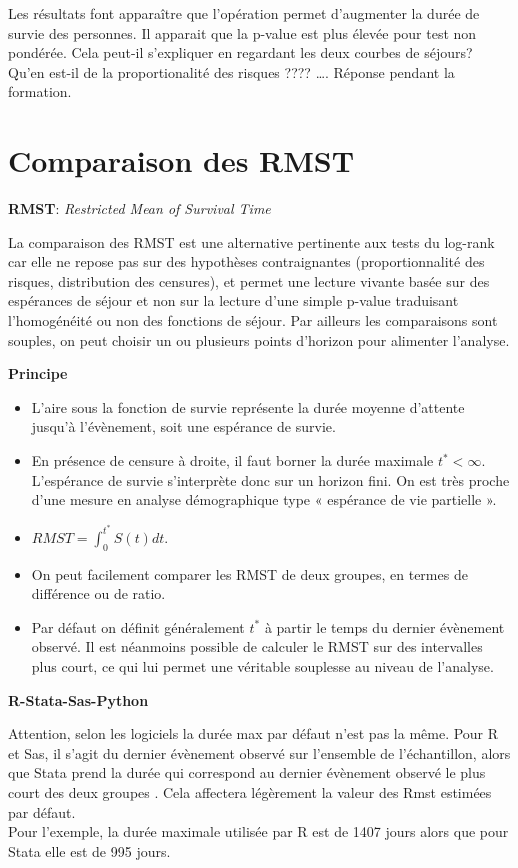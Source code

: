 \documentclass[
  12pt,
  letterpaper,
  DIV=11,
  numbers=noendperiod,
  onepage,
  openany]{scrreprt}
\providecommand{\tightlist}{%
  \setlength{\itemsep}{0pt}\setlength{\parskip}{0pt}}\usepackage{longtable,booktabs,array}
\begin{document}
Les résultats font apparaître que l'opération permet d'augmenter la
durée de survie des personnes. Il apparait que la p-value est plus
élevée pour test non pondérée. Cela peut-il s'expliquer en regardant les
deux courbes de séjours? Qu'en est-il de la proportionalité des risques
???? \ldots. Réponse pendant la formation.

\hypertarget{comparaison-des-rmst}{%
\section{Comparaison des RMST}\label{comparaison-des-rmst}}

\textbf{RMST}: \emph{Restricted Mean of Survival Time}

La comparaison des RMST est une alternative pertinente aux tests du
log-rank car elle ne repose pas sur des hypothèses contraignantes
(proportionnalité des risques, distribution des censures), et permet une
lecture vivante basée sur des espérances de séjour et non sur la lecture
d'une simple p-value traduisant l'homogénéité ou non des fonctions de
séjour. Par ailleurs les comparaisons sont souples, on peut choisir un
ou plusieurs points d'horizon pour alimenter l'analyse.

\textbf{Principe}

\begin{itemize}
\tightlist
\item
  L'aire sous la fonction de survie représente la durée moyenne
  d'attente jusqu'à l'évènement, soit une espérance de survie.
\item
  En présence de censure à droite, il faut borner la durée maximale
  \(t^*<\infty\). L'espérance de survie s'interprète donc sur un horizon
  fini. On est très proche d'une mesure en analyse démographique type «
  espérance de vie partielle ».
\item
  \(RMST =\int_0^{t^*}S(t)dt\).
\item
  On peut facilement comparer les RMST de deux groupes, en termes de
  différence ou de ratio.
\item
  Par défaut on définit généralement \(t^*\) à partir le temps du
  dernier évènement observé. Il est néanmoins possible de calculer le
  RMST sur des intervalles plus court, ce qui lui permet une véritable
  souplesse au niveau de l'analyse.
\end{itemize}

\textbf{R-Stata-Sas-Python}

Attention, selon les logiciels la durée max par défaut n'est pas la
même. Pour R et Sas, il s'agit du dernier évènement observé sur
l'ensemble de l'échantillon, alors que Stata prend la durée qui
correspond au dernier évènement observé le plus court des deux groupes .
Cela affectera légèrement la valeur des Rmst estimées par défaut.\\
Pour l'exemple, la durée maximale utilisée par R est de 1407 jours alors
que pour Stata elle est de 995 jours.
\end{document}
